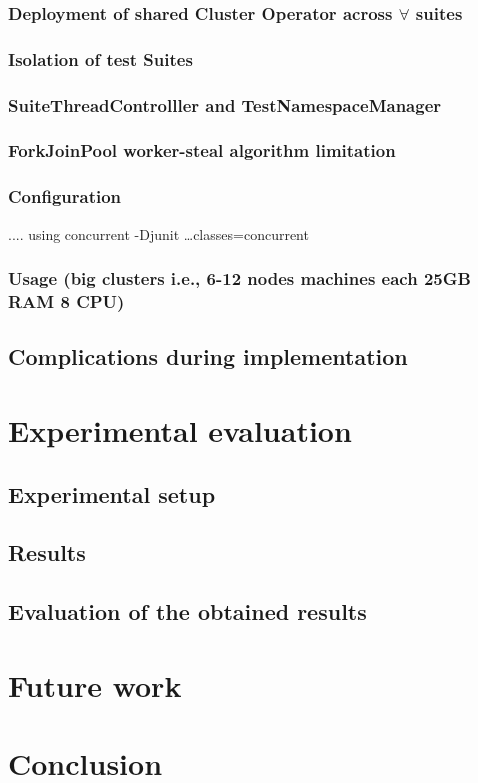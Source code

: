 \subsection{Deployment of shared Cluster Operator across $\forall$ suites}
\subsection{Isolation of test Suites}
\subsection{SuiteThreadControlller and TestNamespaceManager}
\subsection{ForkJoinPool worker-steal algorithm limitation}
\subsection{Configuration}
.... using concurrent -Djunit \dots classes=concurrent
\subsection{Usage (big clusters i.e., 6-12 nodes machines each 25GB RAM 8 CPU)}

\section{Complications during implementation}

\chapter{Experimental evaluation}
\label{06:chapter:title}

\section{Experimental setup}
\section{Results}
\section{Evaluation of the obtained results}

\chapter{Future work}
\label{07:chapter:title}


\chapter{Conclusion}
\label{08:chapter:title}
